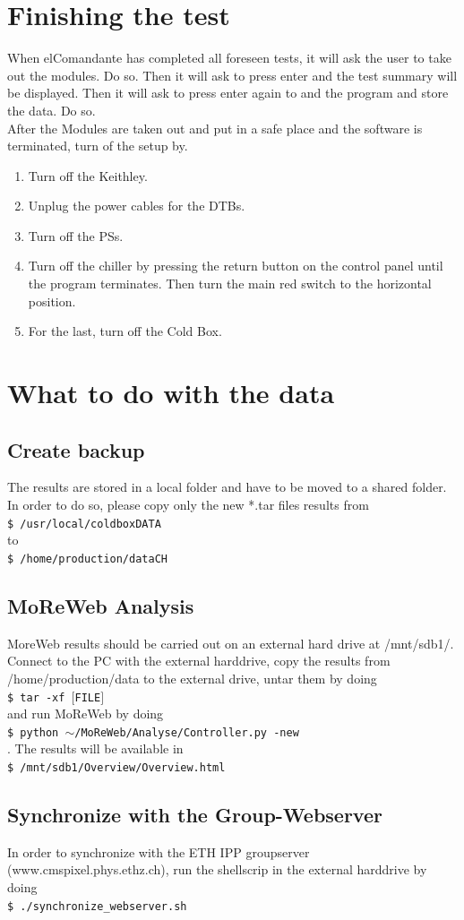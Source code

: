 \documentclass[fleqn,10pt]{SelfArx} %
\newcommand{\shellcmd}[1]{\\\indent\indent\texttt{\footnotesize\$ #1}\\}
\begin{document}
\section{Finishing the test}
When elComandante has completed all foreseen tests, it will ask the user to take out the modules. Do so. Then it will ask to press enter and the test summary will be displayed. Then it will ask to press enter again to and the program and store the data. Do so. \\
After the Modules are taken out and put in a safe place and the software is terminated, turn of the setup by.
\begin{enumerate}
\item Turn off the Keithley.
\item Unplug the power cables for the DTBs.
\item Turn off the PSs.
\item Turn off the chiller by pressing the return button on the control panel until the program terminates. Then turn the main red switch to the horizontal position.
\item For the last, turn off the Cold Box.
\end{enumerate}

\section{What to do with the data}\label{postdata}
\subsection{Create backup}
The results are stored in a local folder and have to be moved to a shared folder. In order to do so, please copy only the new *.tar files results from 
\shellcmd{/usr/local/coldboxDATA} 
to
\shellcmd{/home/production/dataCH}

\subsection{MoReWeb Analysis}
MoreWeb results should be carried out on an external hard drive at /mnt/sdb1/. Connect to the PC with the external harddrive, copy the results from /home/production/data to the external drive, untar them by doing 
\shellcmd{tar -xf $[$FILE$]$}
and run MoReWeb by doing 
\shellcmd{python $\sim$/MoReWeb/Analyse/Controller.py -new}. 
The results will be available in 
\shellcmd {/mnt/sdb1/Overview/Overview.html}

\subsection{Synchronize with the Group-Webserver}
In order to synchronize with the ETH IPP groupserver \newline 
(www.cmspixel.phys.ethz.ch), run the shellscrip in the external harddrive by doing
\shellcmd {./synchronize\_webserver.sh}
\end{document}
